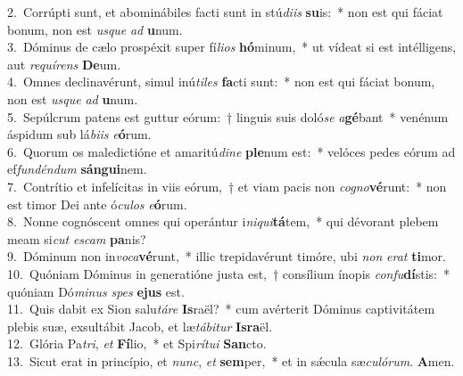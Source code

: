 {2.~}Corrúpti sunt, et abominábiles facti sunt in stú\textit{di}\textit{is} \textbf{su}is:~* non est qui fáciat bonum, non est \textit{us}\textit{que} \textit{ad} \textbf{u}num.\\
{3.~}Dóminus de cælo prospéxit super fí\textit{li}\textit{os} \textbf{hó}minum,~* ut vídeat si est intélligens, aut \textit{re}\textit{quí}\textit{rens} \textbf{De}um.\\
{4.~}Omnes declinavérunt, simul inú\textit{ti}\textit{les} \textbf{fa}cti sunt:~* non est qui fáciat bonum, non est \textit{us}\textit{que} \textit{ad} \textbf{u}num.\\
{5.~}Sepúlcrum patens est guttur eórum:~† linguis suis doló\textit{se} \textit{a}\textbf{gé}bant~* venénum áspidum sub lá\textit{bi}\textit{is} \textit{e}\textbf{ó}rum.\\
{6.~}Quorum os maledictióne et amaritú\textit{di}\textit{ne} \textbf{ple}num est:~* velóces pedes eórum ad ef\textit{fun}\textit{dén}\textit{dum} \textbf{sán}\textbf{gui}nem.\\
{7.~}Contrítio et infelícitas in viis eórum,~† et viam pacis non \textit{co}\textit{gno}\textbf{vé}runt:~* non est timor Dei ante ó\textit{cu}\textit{los} \textit{e}\textbf{ó}rum.\\
{8.~}Nonne cognóscent omnes qui operántur i\textit{ni}\textit{qui}\textbf{tá}tem,~* qui dévorant plebem meam si\textit{cut} \textit{e}\textit{scam} \textbf{pa}nis?\\
{9.~}Dóminum non in\textit{vo}\textit{ca}\textbf{vé}runt,~* illic trepidavérunt timóre, ubi \textit{non} \textit{e}\textit{rat} \textbf{ti}mor.\\
{10.~}Quóniam Dóminus in generatióne justa est,~† consílium ínopis \textit{con}\textit{fu}\textbf{dí}stis:~* quóniam Dó\textit{mi}\textit{nus} \textit{spes} \textbf{e}\textbf{jus} est.\\
{11.~}Quis dabit ex Sion salu\textit{tá}\textit{re} \textbf{Is}raël?~* cum avérterit Dóminus captivitátem plebis suæ, exsultábit Jacob, et læ\textit{tá}\textit{bi}\textit{tur} \textbf{Is}\textbf{ra}ël.\\
{12.~}Glória Pa\textit{tri}, \textit{et} \textbf{Fí}lio,~* et Spi\textit{rí}\textit{tu}\textit{i} \textbf{San}cto.\\
{13.~}Sicut erat in princípio, et \textit{nunc}, \textit{et} \textbf{sem}per,~* et in sǽcula sæ\textit{cu}\textit{ló}\textit{rum}. \textbf{A}men.\\
